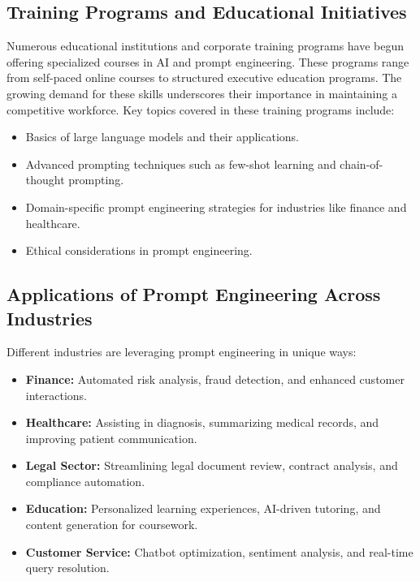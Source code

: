 \documentclass[a4paper,headinclude=on,footinclude=on,12pt,oneside]{scrbook}
\begin{document}
\subsection{Training Programs and Educational Initiatives}
Numerous educational institutions and corporate training programs have begun offering specialized courses in AI and prompt engineering. These programs range from self-paced online courses to structured executive education programs. The growing demand for these skills underscores their importance in maintaining a competitive workforce. Key topics covered in these training programs include:
\begin{itemize}
	\item Basics of large language models and their applications.
	\item Advanced prompting techniques such as few-shot learning and chain-of-thought prompting.
	\item Domain-specific prompt engineering strategies for industries like finance and healthcare.
	\item Ethical considerations in prompt engineering.
\end{itemize}

\subsection{Applications of Prompt Engineering Across Industries}
Different industries are leveraging prompt engineering in unique ways:
\begin{itemize}
	\item \textbf{Finance:} Automated risk analysis, fraud detection, and enhanced customer interactions.
	\item \textbf{Healthcare:} Assisting in diagnosis, summarizing medical records, and improving patient communication.
	\item \textbf{Legal Sector:} Streamlining legal document review, contract analysis, and compliance automation.
	\item \textbf{Education:} Personalized learning experiences, AI-driven tutoring, and content generation for coursework.
	\item \textbf{Customer Service:} Chatbot optimization, sentiment analysis, and real-time query resolution.
\end{itemize}
\end{document}
